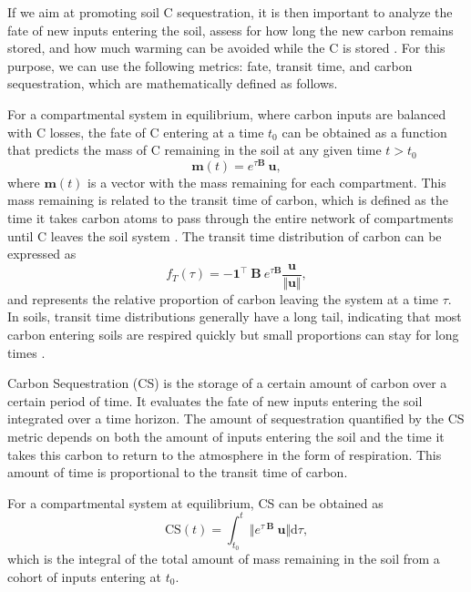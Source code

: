 \documentclass[11pt, oneside, a4paper]{article}   	%
\begin{document}
If we aim at promoting soil C sequestration, it is then important to analyze the fate of new inputs entering the soil, assess for how long the new carbon remains stored, and how much warming can be avoided while the C is stored \citep{Sierra2021BGS, Crow2022}. For this purpose, we can use the following metrics: fate, transit time, and carbon sequestration, which are mathematically defined as follows.

For a compartmental system in equilibrium, where carbon inputs are balanced with C losses, the fate of C entering at a time $t_0$ can be obtained as a function that predicts the mass of C remaining in the soil at any given time $t > t_0$ \citep{Sierra2021JE}
\begin{equation}
\bm{m}(t) = e^{\tau \mathbf{B}} \ \bm{u},
\end{equation}
where $\bm{m}(t)$ is a vector with the mass remaining for each compartment. This mass remaining is related to the transit time of carbon, which is defined as the time it takes carbon atoms to pass through the entire network of compartments until C leaves the soil system \citep{Bolin1973, Manzoni2009JGR, Sierra2018JAMES}. The transit time distribution of carbon can be expressed as \citep{Metzler2018MG}
\begin{equation} \label{eq:transitTime}
f_T(\tau) = -\bm{1}^{\top} \ \mathbf{B} \ e^{\tau \mathbf{B}} \frac{\bm{u}}{\Vert \bm{u} \Vert},
\end{equation}
and represents the relative proportion of carbon leaving the system at a time $\tau$. In soils, transit time distributions generally have a long tail, indicating that most carbon entering soils are respired quickly but small proportions can stay for long times \citep{Sierra2018GBC}. 


Carbon Sequestration (CS) is the storage of a certain amount of carbon over a certain period of time. It evaluates the fate of new inputs entering the soil integrated over a time horizon. The amount of sequestration quantified by the CS metric depends on both the amount of inputs entering the soil and the time it takes this carbon to return to the atmosphere in the form of respiration. This amount of time is proportional to the transit time of carbon. 


For a compartmental system at equilibrium, CS can be obtained as \citep{Sierra2021BGS}
\begin{equation} \label{eq:CS}
 \mathrm{CS}(t) = \int_{t_0}^t \Vert e^{\tau \ \mathbf{B}} \ \bm{u} \Vert \mathrm{d} \tau,
\end{equation}
which is the integral of the total amount of mass remaining in the soil from a cohort of inputs entering at $t_0$.
\end{document}
